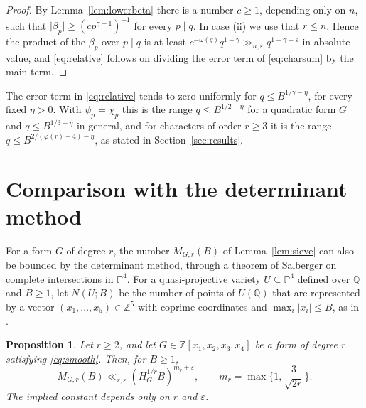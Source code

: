 \documentclass[11pt]{amsart}
\numberwithin{equation}{section}
\numberwithin{figure}{section}
\newtheorem{proposition}{Proposition}[section]
\theoremstyle{definition}
\newcommand{\Z}{\mathbb{Z}}
\newcommand{\Q}{\mathbb{Q}}
\newcommand{\eps}{\varepsilon}
\newcommand{\abs}[1]{\lvert #1\rvert}
\newcommand{\PP}{\mathbb P}
\begin{document}
\begin{proof}
By Lemma~\ref{lem:lowerbeta} there is a number $c\ge1$, depending
only on $n$, such that $\abs{\beta_p}\ge(cp^{\gamma-1})^{-1}$ for
every $p\mid q$. In case (ii) we use that $r\le n$. Hence the product
of the $\beta_p$ over $p\mid q$ is at least
$c^{-\omega(q)}q^{1-\gamma}\gg_{n,\eps}q^{1-\gamma-\eps}$ in absolute
value, and \eqref{eq:relative} follows on dividing the error term of
\eqref{eq:charsum} by the main term.
\end{proof}

The error term in \eqref{eq:relative} tends to zero uniformly for
$q\le B^{1/\gamma-\eta}$, for every fixed $\eta>0$. With
$\psi_p=\chi_p$ this is the range $q\le B^{1/2-\eta}$ for a quadratic
form $G$ and $q\le B^{1/3-\eta}$ in general, and for characters of
order $r\ge3$ it is the range $q\le B^{2/(\varphi(r)+4)-\eta}$, as
stated in Section~\ref{sec:results}.

\section{Comparison with the determinant method}\label{sec:fixed}

For a form $G$ of degree $r$, the number $M_{G,r}(B)$ of
Lemma~\ref{lem:sieve} can also be bounded by the determinant method,
through a theorem of Salberger \cite{S} on complete intersections in
$\PP^4$. For a quasi-projective variety $U\subseteq\PP^4$ defined
over $\Q$ and $B\ge1$, let $N(U;B)$ be the number of points of
$U(\Q)$ that are represented by a vector
$(x_1,\ldots,x_5)\in\Z^5$ with coprime coordinates and
$\max_i\abs{x_i}\le B$, as in \cite{S}.

\begin{proposition}\label{prop:salberger}
Let $r\ge2$, and let $G\in\Z[x_1,x_2,x_3,x_4]$ be a form of degree
$r$ satisfying \eqref{eq:smooth}. Then, for $B\ge1$,
\begin{equation}\label{eq:salberger}
 M_{G,r}(B)\ll_{r,\eps}(H_G^{1/r}B)^{m_r+\eps},
 \qquad m_r=\max\Big\{1,\frac3{\sqrt{2r}}\Big\}.
\end{equation}
The implied constant depends only on $r$ and $\eps$.
\end{proposition}
\end{document}
